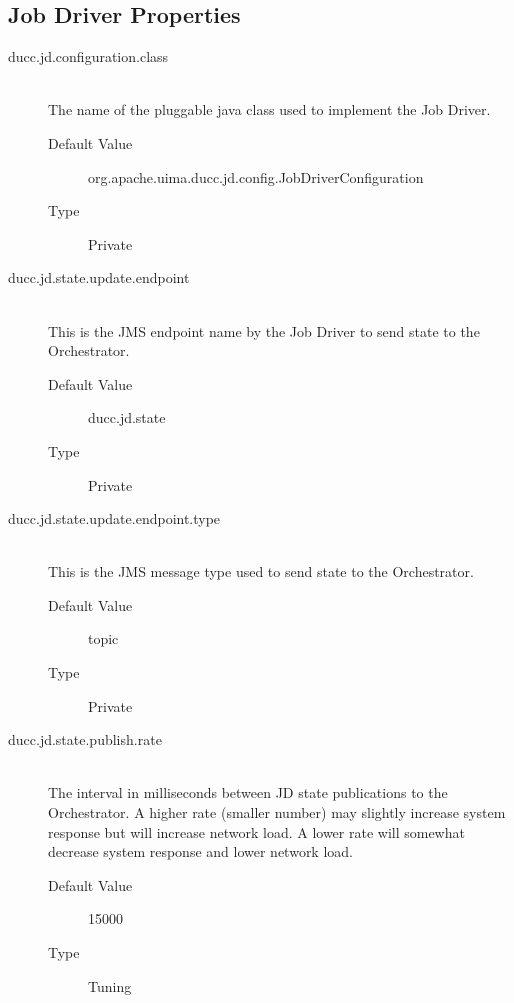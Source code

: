 \subsection{Job Driver Properties}
    \begin{description}
        \item[ducc.jd.configuration.class] \hfill \\
          The name of the pluggable java class used to implement the Job Driver. 
          \begin{description}
            \item[Default Value] org.apache.uima.ducc.jd.config.JobDriverConfiguration 
            \item[Type] Private 
          \end{description}
          
        \item[ducc.jd.state.update.endpoint] \hfill \\
          This is the JMS endpoint name by the Job Driver to send state to the Orchestrator. 
          \begin{description}
            \item[Default Value] ducc.jd.state               
            \item[Type] Private 
          \end{description}
            

        \item[ducc.jd.state.update.endpoint.type] \hfill \\
          This is the JMS message type used to send state to the Orchestrator. 
          \begin{description}            
            \item[Default Value] topic 
            \item[Type] Private 
          \end{description}
          

        \item[ducc.jd.state.publish.rate] \hfill \\
          The interval in milliseconds between JD state publications to the Orchestrator.
          A higher rate (smaller number)
          may slightly increase system response but will increase network load. A lower rate will 
          somewhat decrease system response and lower network load. 
          \begin{description}
            \item[Default Value] 15000 
            \item[Type] Tuning 
          \end{description}


\end{description}
